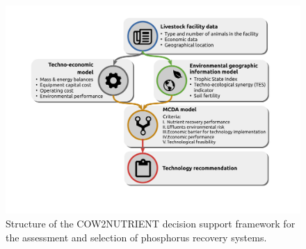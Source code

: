 \documentclass[authoryear]{elsarticle}
\begin{document}
%
%
%
\begin{figure}[h]
	\centering
	\includegraphics[width=0.85\linewidth, trim={3cm 4cm 4cm 1.5cm},clip]{tool_diagram_v4color.pdf} 
	\caption{Structure of the COW2NUTRIENT decision support framework for the assessment and selection of phosphorus recovery systems.}
	\label{fig:tool_diagram}
\end{figure}
%
\end{document}
